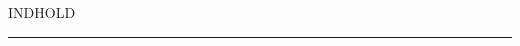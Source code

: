 \documentclass[12pt]{article}
\newcommand{\opage}[1]{\marginnote{\footnotesize\textit{[#1]}}}
\begin{document}
\opage{109} %
%
%
\clearpage
{\centering\large INDHOLD\par}
\vspace{0.6ex}
{\centering\rule{2.4cm}{0.4pt}\par}
\end{document}
